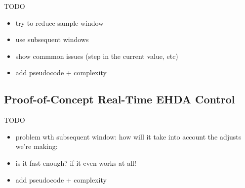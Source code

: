 \documentclass[oneside,12pt]{article}
\begin{document}
TODO
\begin{itemize}
    \item try to reduce sample window
    \item use subsequent windows
    \item show commmon issues (step in the current value, etc)
    \item add pseudocode + complexity
\end{itemize}

\subsection{Proof-of-Concept Real-Time EHDA Control}
TODO

\begin{itemize}
    \item problem wth subsequent window: how will it take into account the adjusts we're making:
    \item is it fast enough? if it even works at all!
    \item add pseudocode + complexity
\end{itemize}

\newpage    \pagestyle{plain}

\end{document}
